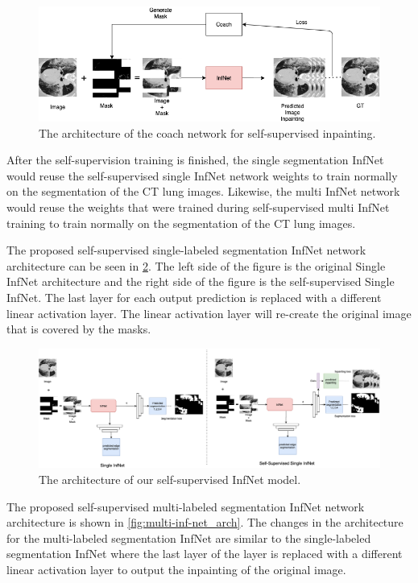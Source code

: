 \begin{figure}
	\centering
	\small
	\includegraphics[width=\linewidth]{coach.png}
	\caption{The architecture of the coach network for self-supervised inpainting. }
	\label{fig:coach-arch}
\end{figure}

After the self-supervision training is finished, the single segmentation InfNet would reuse the self-supervised single InfNet network weights to train normally on the segmentation of the CT lung images. Likewise, the multi InfNet network would reuse the weights that were trained during self-supervised multi InfNet training to train normally on the segmentation of the CT lung images.

The proposed self-supervised single-labeled segmentation InfNet network architecture can be seen in \ref{fig:inf-net_arch}. The left side of the figure is the original Single InfNet architecture and the right side of the figure is the self-supervised Single InfNet. The last layer for each output prediction is replaced with a different linear activation layer. The linear activation layer will re-create the original image that is covered by the masks. 

\begin{figure}
	\centering
	\small
	\includegraphics[width=\linewidth]{self-super-inf-net.png}
	\caption{The architecture of our self-supervised InfNet model. }
	\label{fig:inf-net_arch}
\end{figure}


The proposed self-supervised multi-labeled segmentation InfNet network architecture is shown in \ref{fig:multi-inf-net_arch}. The changes in the architecture for the multi-labeled segmentation InfNet are similar to the single-labeled segmentation InfNet where the last layer of the layer is replaced with a different linear activation layer to output the inpainting of the original image. 

